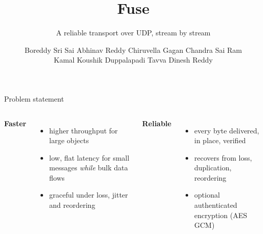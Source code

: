 \documentclass[aspectratio=169,11pt]{beamer}
\title{Fuse}
\subtitle{A reliable transport over UDP, stream by stream}
\author{Boreddy Sri Sai Abhinav Reddy \quad\textbar\quad Chiruvella Gagan Chandra Sai Ram\\[2pt]
        Kamal Koushik Duppalapadi \quad\textbar\quad Tavva Dinesh Reddy}
\institute{CS3530: Computer Networks}
\date{}
\begin{document}
\begin{frame}[plain]
  \titlepage
\end{frame}

\begin{frame}{Problem statement}
  \begin{center}
  \end{center}
  \vspace{4mm}
  \begin{columns}[T]
    \textbf{Faster}
    \begin{itemize}\small
      \item higher throughput for large objects
      \item low, flat latency for small messages \emph{while} bulk data flows
      \item graceful under loss, jitter and reordering
    \end{itemize}
    \textbf{Reliable}
    \begin{itemize}\small
      \item every byte delivered, in place, verified
      \item recovers from loss, duplication, reordering
      \item optional authenticated encryption (AES GCM)
    \end{itemize}
  \end{columns}
\end{frame}
\end{document}

